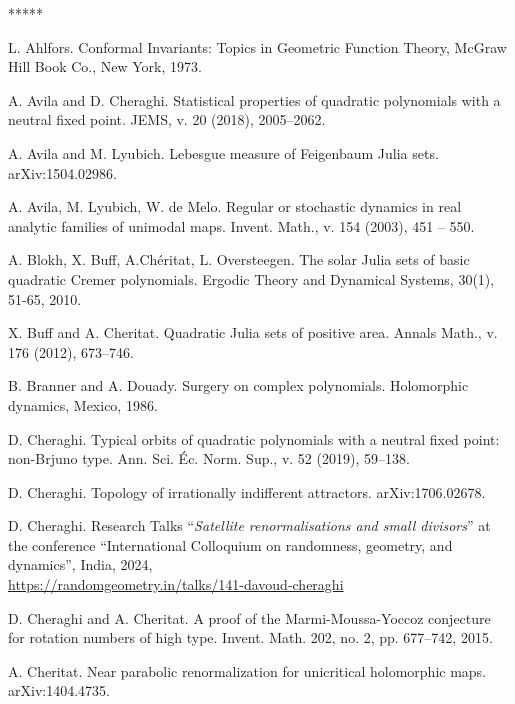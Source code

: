 \documentclass{amsart}
\newcommand{\1}{{\mathbb 1 }}
\theoremstyle{remark}
\numberwithin{equation}{section}
\theoremstyle{definition}
\begin{document}
\begin{thebibliography}{*****}

 L. Ahlfors. Conformal Invariants: Topics in Geometric Function Theory, McGraw Hill Book Co., New York, 1973.






 A. Avila and D. Cheraghi.
  Statistical properties of quadratic polynomials with a neutral fixed point.
  JEMS, v. 20 (2018), 2005--2062.

 


 A. Avila and M. Lyubich. 
Lebesgue measure of Feigenbaum Julia sets. arXiv:1504.02986. 

 A. Avila, M. Lyubich, W. de Melo. Regular or stochastic dynamics in real analytic families of unimodal maps. Invent. Math., v. 154 (2003), 451 -- 550.

 A. Blokh, X. Buff, A.Chéritat, L. Oversteegen. The solar Julia sets of basic quadratic Cremer polynomials. Ergodic Theory and Dynamical Systems, 30(1), 51-65, 2010.


 X. Buff and A. Cheritat. Quadratic Julia sets of
  positive area. Annals Math., v. 176 (2012), 673--746.

 B. Branner and A. Douady. Surgery on complex polynomials. Holomorphic dynamics, {M}exico, 1986.

  D. Cheraghi. Typical orbits of quadratic polynomials with a neutral fixed point: non-Brjuno type. Ann. Sci. \'Ec. Norm. Sup., v. 52 (2019), 59--138.

  D. Cheraghi.  Topology of irrationally indifferent attractors. arXiv:1706.02678.
 
   D. Cheraghi. Research Talks ``\emph{Satellite renormalisations and small divisors}'' at the conference ``International Colloquium on randomness, geometry, and dynamics'', India, 2024,\\ \href{https://randomgeometry.in/talks/141-davoud-cheraghi}{https://randomgeometry.in/talks/141-davoud-cheraghi}
   
   D. Cheraghi and A. Cheritat. A proof of the Marmi-Moussa-Yoccoz conjecture for rotation numbers of high type. Invent. Math. 202, no. 2, pp. 677–742, 2015.

  A. Cheritat. Near parabolic renormalization for unicritical holomorphic maps. arXiv:1404.4735.



\end{thebibliography}
\end{document}
